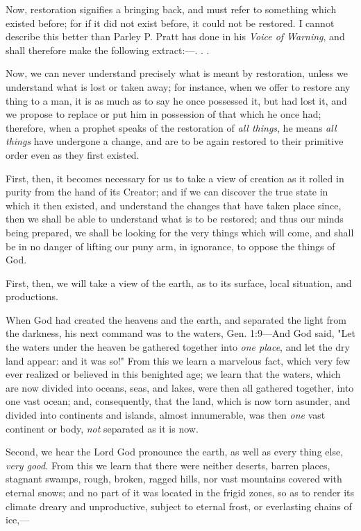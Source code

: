 Now, restoration signifies a bringing back, and must refer to something which existed before;
for if it did not exist before, it could not be restored. I cannot describe this better than Parley
P. Pratt has done in his \textit{Voice of Warning}, and shall therefore make the following extract:—. .
.

Now, we can never understand precisely what is meant by restoration, unless we understand
what is lost or taken away; for instance, when we offer to restore any thing to a man, it is as
much as to say he once possessed it, but had lost it, and we propose to replace or put him in
possession of that which he once had; therefore, when a prophet speaks of the restoration of
\textit{all things}, he means \textit{all things} have undergone a change, and are to be again restored to their
primitive order even as they first existed.

First, then, it becomes necessary for us to take a view of creation as it rolled in purity from
the hand of its Creator; and if we can discover the true state in which it then existed, and
understand the changes that have taken place since, then we shall be able to understand what
is to be restored; and thus our minds being prepared, we shall be looking for the very things
which will come, and shall be in no danger of lifting our puny arm, in ignorance, to oppose
the things of God.

First, then, we will take a view of the earth, as to its surface, local situation, and productions.

When God had created the heavens and the earth, and separated the light from the darkness,
his next command was to the waters, Gen. 1:9—And God said, "Let the waters under the
heaven be gathered together into \textit{one place}, and let the dry land appear: and it was so!" From
this we learn a marvelous fact, which very few ever realized or believed in this benighted
age; we learn that the waters, which are now divided into oceans, seas, and lakes, were then
all gathered together, into one vast ocean; and, consequently, that the land, which is now torn
asunder, and divided into continents and islands, almost innumerable, was then \textit{one} vast
continent or body, \textit{not} separated as it is now.

Second, we hear the Lord God pronounce the earth, as well as every thing else, \textit{very good.}
From this we learn that there were neither deserts, barren places, stagnant swamps, rough,
broken, ragged hills, nor vast mountains covered with eternal snows; and no part of it was
located in the frigid zones, so as to render its climate dreary and unproductive, subject to
eternal frost, or everlasting chains of ice,—

